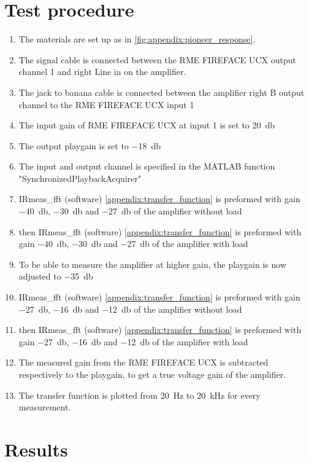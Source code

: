 \section*{Test procedure}


\begin{enumerate}
\item The materials are set up as in \autoref{fig:appendix:pioneer_response}.
\item The signal cable is connected between the RME FIREFACE UCX output channel 1 and right Line in on the amplifier.
\item The jack to banana cable is connected between the amplifier right B output channel to the  RME FIREFACE UCX input 1 
\item The input gain of RME FIREFACE UCX at input 1 is set to \SI{20}{\decibel}
\item The output playgain is set to \SI{-18}{\decibel}
\item The input and output channel is specified in the MATLAB function "SynchronizedPlaybackAcquirer" 
\item IRmeas_fft (software) \autoref{appendix:transfer_function} is preformed with gain \SI{-40}{\decibel}, \SI{-30}{\decibel} and \SI{-27}{\decibel} of the amplifier without load 
\item then IRmeas_fft (software) \autoref{appendix:transfer_function} is preformed with gain \SI{-40}{\decibel}, \SI{-30}{\decibel} and \SI{-27}{\decibel} of the amplifier with load 
\item To be able to measure the amplifier at higher gain, the playgain is now adjusted to \SI{-35}{\decibel}
\item  IRmeas_fft (software) \autoref{appendix:transfer_function} is preformed with gain \SI{-27}{\decibel}, \SI{-16}{\decibel} and \SI{-12}{\decibel} of the amplifier without load
\item then IRmeas_fft (software) \autoref{appendix:transfer_function} is preformed with gain \SI{-27}{\decibel}, \SI{-16}{\decibel} and \SI{-12}{\decibel} of the amplifier with load
\item The measured gain from the RME FIREFACE UCX is subtracted respectively to the playgain, to get a true voltage gain of the amplifier.
\item The transfer function is plotted from \SI{20}{\hertz} to \SI{20}{\kilo\hertz} for every measurement.

\end{enumerate}

\section*{Results}



